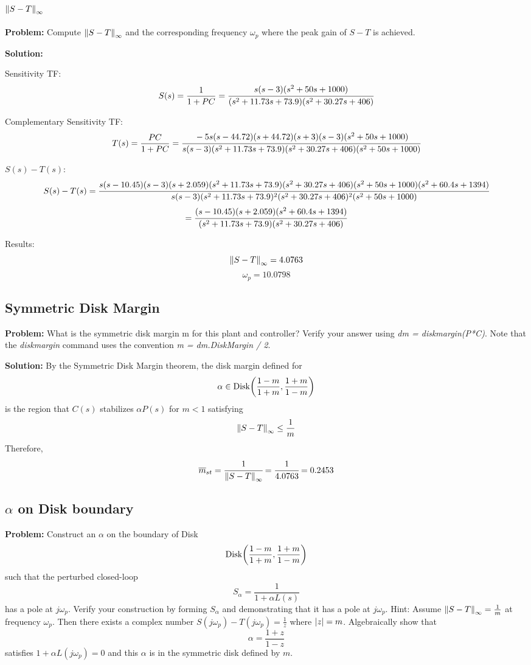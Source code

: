 \documentclass[letter]{article}
\numberwithin{equation}{section}
\begin{document}
\subsection{$\norm{S-T}_\infty$}
\textbf{Problem:}
Compute $\norm{S-T}_\infty$ and the corresponding frequency $\omega_{p}$ where the peak gain of $S-T$ is achieved.

\textbf{Solution:} 

Sensitivity TF: \[
	S(s) = \frac{1}{1+PC}
		= \cfrac{
			s (s-3) (s^2 + 50s + 1000)
		}{
			(s^2 + 11.73s + 73.9) (s^2 + 30.27s + 406)
		}
\]

Complementary Sensitivity TF: \[
	T(s) = \frac{PC}{1+PC}
		= \cfrac{
			-5 s (s-44.72) (s+44.72) (s+3) (s-3) (s^2 + 50s + 1000)
		}{
			s (s-3) (s^2 + 11.73s + 73.9) (s^2 + 30.27s + 406) (s^2 + 50s + 1000)
		}
\]

$S(s)-T(s)$: \[
	S(s)-T(s) = \cfrac{
		s (s-10.45) (s-3) (s+2.059) (s^2 + 11.73s + 73.9) (s^2 + 30.27s + 406) (s^2 + 50s + 1000) (s^2 + 60.4s + 1394)
		}{
			s (s-3) (s^2 + 11.73s + 73.9)^2 (s^2 + 30.27s + 406)^2 (s^2 + 50s + 1000)
		}
\]\[
	= \cfrac{
		(s-10.45) (s+2.059) (s^2 + 60.4s + 1394)
		}{
			(s^2 + 11.73s + 73.9) (s^2 + 30.27s + 406)
		}
\]

Results:\[
	\norm{S-T}_\infty = 4.0763
\]\[
	\omega_{p} = 10.0798
\]

\subsection{Symmetric Disk Margin}
\textbf{Problem:}
What is the symmetric disk margin m for this plant and controller? 
Verify your answer using \emph{dm = diskmargin(P*C)}. 
Note that the \emph{diskmargin} command uses the convention \emph{m = dm.DiskMargin / 2}.

\textbf{Solution:}
By the Symmetric Disk Margin theorem, the disk margin defined for \[
	\alpha \in \text{Disk}\qty(\frac{1-m}{1+m},\frac{1+m}{1-m})
\] is the region that $C(s)$ stabilizes $\alpha P(s)$ for $m < 1$ satisfying\[
	\norm{S-T}_\infty \leq \frac{1}{m}
\] Therefore, \[
	\overline{m}_{st} = \cfrac{1}{\norm{S-T}_\infty} 
	= \cfrac{1}{4.0763} = 0.2453
\]

\subsection{$\alpha$ on Disk boundary}
\textbf{Problem:}
Construct an $\alpha$ on the boundary of Disk \[
	\text{Disk}\qty(\frac{1-m}{1+m},\frac{1+m}{1-m})
\] such that the perturbed closed-loop \[
	S_\alpha = \frac{1}{1 + \alpha L(s)}
\] has a pole at $j\omega_p$. 
Verify your construction by forming $S_\alpha$ and demonstrating that it has a pole at $j \omega_p$.
Hint: Assume $\norm{S-T}_\infty = \frac{1}{m}$ at frequency $\omega_p$. 
Then there exists a complex number $S(j\omega_p) - T(j\omega_p) = \frac{1}{z}$ where $\abs{z} = m$.
Algebraically show that \[
	\alpha = \frac{1 + z}{1-z}
\] satisfies $1 + \alpha L(j\omega_p) = 0$ and this $\alpha$ is in the symmetric disk defined by $m$.
\end{document}
